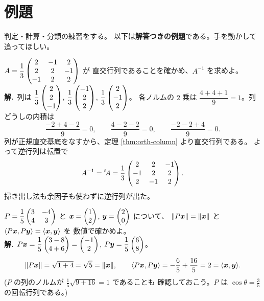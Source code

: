 \section{例題}

判定・計算・分類の練習をする。
以下は\textbf{解答つきの例題}である。手を動かして追ってほしい。

\begin{rei}[例題・基本(判定と逆行列)]\label{rei:orth-check}
$A = \dfrac{1}{3}\begin{pmatrix}2 & -1 & 2 \\ 2 & 2 & -1 \\ -1 & 2 & 2\end{pmatrix}$ が
直交行列であることを確かめ、$A^{-1}$ を求めよ。\\
\textbf{解.}\ 列は $\dfrac{1}{3}\begin{pmatrix}2 \\ 2 \\ -1\end{pmatrix}$,
$\dfrac{1}{3}\begin{pmatrix}-1 \\ 2 \\ 2\end{pmatrix}$, $\dfrac{1}{3}\begin{pmatrix}2 \\ -1 \\ 2\end{pmatrix}$。
各ノルムの $2$ 乗は $\dfrac{4 + 4 + 1}{9} = 1$。列どうしの内積は
\[
\frac{-2 + 4 - 2}{9} = 0, \qquad \frac{4 - 2 - 2}{9} = 0, \qquad
\frac{-2 - 2 + 4}{9} = 0.
\]
列が正規直交基底をなすから、定理 \ref{thm:orth-column} より直交行列である。
よって逆行列は転置で
\[
A^{-1} = {}^t\!A = \frac{1}{3}\begin{pmatrix}2 & 2 & -1 \\ -1 & 2 & 2 \\ 2 & -1 & 2\end{pmatrix}.
\]
掃き出し法も余因子も使わずに逆行列が出た。
\end{rei}

\begin{rei}[例題・基本(保存性質の確認)]\label{rei:orth-preserve-ex}
$P = \dfrac{1}{5}\begin{pmatrix}3 & -4 \\ 4 & 3\end{pmatrix}$ と
$\bm{x} = \begin{pmatrix}1 \\ 2\end{pmatrix}$, $\bm{y} = \begin{pmatrix}2 \\ 0\end{pmatrix}$ について、
$\|P\bm{x}\| = \|\bm{x}\|$ と
$\langle P\bm{x}, P\bm{y} \rangle = \langle \bm{x}, \bm{y} \rangle$ を
数値で確かめよ。\\
\textbf{解.}\ $P\bm{x} = \dfrac{1}{5}\begin{pmatrix}3 - 8 \\ 4 + 6\end{pmatrix} = \begin{pmatrix}-1 \\ 2\end{pmatrix}$,
$P\bm{y} = \dfrac{1}{5}\begin{pmatrix}6 \\ 8\end{pmatrix}$。
\[
\|P\bm{x}\| = \sqrt{1 + 4} = \sqrt{5} = \|\bm{x}\|, \qquad
\langle P\bm{x}, P\bm{y} \rangle = -\frac{6}{5} + \frac{16}{5} = 2
= \langle \bm{x}, \bm{y} \rangle.
\]
($P$ の列のノルムが $\frac{1}{5}\sqrt{9 + 16} = 1$ であることも
確認しておこう。$P$ は $\cos\theta = \frac{3}{5}$ の回転行列である。)
\end{rei}

